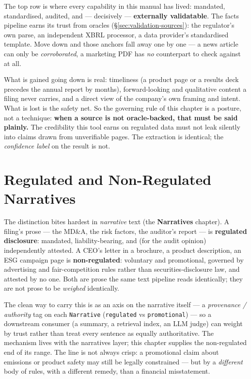 \documentclass[11pt,a4paper]{report}
\begin{document}
The top row is where every capability in this manual has lived: mandated, standardised, audited, and ---
decisively --- \textbf{externally validatable}. The facts pipeline earns its trust from oracles
(\S\ref{sec:validation-sources}): the regulator's own parse, an independent XBRL processor, a data provider's
standardised template. Move down and those anchors fall away one by one --- a news article can only be
\emph{corroborated}, a marketing PDF has \emph{no} counterpart to check against at all.

What is gained going down is real: timeliness (a product page or a results deck precedes the annual report by
months), forward-looking and qualitative content a filing never carries, and a direct view of the company's
own framing and intent. What is lost is the safety net. So the governing rule of this chapter is a posture,
not a technique: \textbf{when a source is not oracle-backed, that must be said plainly.} The credibility this
tool earns on regulated data must not leak silently into claims drawn from unverifiable pages. The extraction
is identical; the \emph{confidence label} on the result is not.

\section{Regulated and Non-Regulated Narratives}
\label{sec:narrative-provenance}

The distinction bites hardest in \emph{narrative} text (the \textbf{Narratives} chapter). A filing's prose ---
the MD\&A, the risk factors, the auditor's report --- is \textbf{regulated disclosure}: mandated,
liability-bearing, and (for the audit opinion) independently attested. A CEO's letter in a brochure, a product
description, an ESG campaign page is \textbf{non-regulated}: voluntary and promotional, governed by advertising
and fair-competition rules rather than securities-disclosure law, and attested by no one. Both are prose the
same text pipeline reads identically; they are not prose to be \emph{weighed} identically.

The clean way to carry this is as an axis on the narrative itself --- a \emph{provenance / authority} tag on
each \texttt{Narrative} (\texttt{regulated} vs \texttt{promotional}) --- so a downstream consumer (a summary,
a retrieval index, an LLM judge) can weight by trust rather than treat every sentence as equally authoritative.
The mechanism lives with the narratives layer; this chapter supplies the non-regulated end of its range. The
line is not always crisp: a promotional claim about emissions or product safety may still be legally
constrained --- but by a \emph{different} body of rules, with a different remedy, than a financial misstatement.
\end{document}
